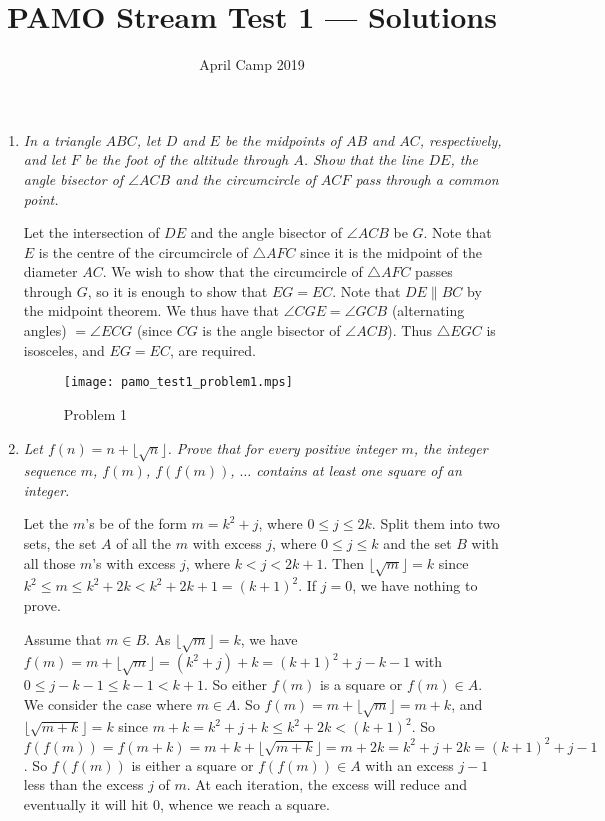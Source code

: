 \documentclass[a4paper, 12pt]{article}
\title{PAMO Stream Test 1 --- Solutions}
\author{April Camp 2019}
\date{}
\begin{document}
 \maketitle

\begin{enumerate}

\item\label{problem:geometry_common_point} %
{\itshape In a triangle $ABC$, let $D$ and $E$ be the midpoints of $AB$ and $AC$, respectively, and let $F$ be the foot of the altitude through $A$. Show that the line $DE$, the angle bisector of $\angle ACB$ and the circumcircle of $ACF$ pass through a common point.}

Let the intersection of $DE$ and the angle bisector of $\angle ACB$ be $G$. Note that $E$ is the centre of the circumcircle of $\triangle AFC$ since it is the midpoint of the diameter $AC$. We wish to show that the circumcircle of $\triangle AFC$ passes through $G$, so it is enough to show that $EG = EC$. Note that $DE \parallel BC$ by the midpoint theorem. We thus have that $\angle CGE = \angle GCB$ (alternating angles) $ = \angle ECG$ (since $CG$ is the angle bisector of $\angle ACB$). Thus $\triangle EGC$ is isosceles, and $EG = EC$, are required.

\begin{figure}[H]
\centering
\texttt{[image: pamo\_test1\_problem1.mps]}
\caption{Problem 1}
\end{figure}


\item {\itshape Let $f(n) = n + \lfloor \sqrt{n} \rfloor$. Prove that for every positive integer $m$, the integer sequence $m$, $f(m)$, $f(f(m))$, $\dots$ contains at least one square of an integer.}

Let the $m$'s be of the form $m = k^2 + j$, where $0 \leq j \leq 2k$. Split them into two sets, the set $A$ of all the $m$ with excess $j$, where $0 \leq j \leq k$ and the set $B$ with all those $m$'s with excess $j$, where $k < j < 2k + 1$. Then $\lfloor \sqrt{m} \rfloor = k$ since $k^2 \leq m \leq k^2 + 2k < k^2 + 2k + 1 = {(k + 1)}^2$. If $j = 0$, we have nothing to prove.

Assume that $m \in B$. As $\lfloor \sqrt{m} \rfloor = k$, we have $f(m) = m + \lfloor \sqrt{m} \rfloor = (k^2 + j) + k = {(k + 1)}^2 + j - k - 1$ with $0 \leq j - k - 1 \leq k  - 1 < k + 1$. So either $f(m)$ is a square or $f(m) \in A$. 
We consider the case where $m \in A$. So $f(m) = m + \lfloor \sqrt{m} \rfloor = m + k$, and $\lfloor \sqrt{m + k} \rfloor = k$ since $m + k = k^2 + j + k \leq k^2 + 2k < {(k + 1)}^2$. So $f(f(m)) = f(m + k) = m + k + \lfloor \sqrt{m + k} \rfloor = m + 2k = k^2 + j + 2k = {(k + 1)}^2 + j - 1$. So $f(f(m))$ is either a square or $f(f(m)) \in A$ with an excess $j - 1$ less than the excess $j$ of $m$. At each iteration, the excess will reduce and eventually it will hit $0$, whence we reach a square.



\end{enumerate}
\end{document}
